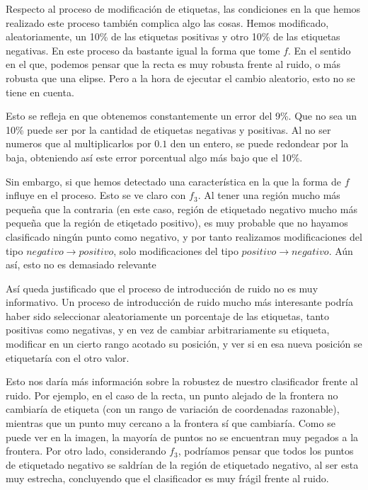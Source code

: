 \documentclass[11pt]{article}
\begin{document}
Respecto al proceso de modificación de etiquetas, las condiciones en la que hemos realizado este proceso también complica algo las cosas. Hemos modificado, aleatoriamente, un 10\% de las etiquetas positivas y otro 10\% de las etiquetas negativas. En este proceso da bastante igual la forma que tome $f$. En el sentido en el que, podemos pensar que la recta es muy robusta frente al ruido, o más robusta que una elipse. Pero a la hora de ejecutar el cambio aleatorio, esto no se tiene en cuenta.

Esto se refleja en que obtenemos constantemente un error del 9\%. Que no sea un 10\% puede ser por la cantidad de etiquetas negativas y positivas. Al no ser numeros que al multiplicarlos por $0.1$ den un entero, se puede redondear por la baja, obteniendo así este error porcentual algo más bajo que el 10\%.

Sin embargo, si que hemos detectado una característica en la que la forma de $f$ influye en el proceso. Esto se ve claro con $f_3$. Al tener una región mucho más pequeña que la contraria (en este caso, región de etiquetado negativo mucho más pequeña que la región de etiqetado positivo), es muy probable que no hayamos clasificado ningún punto como negativo, y por tanto realizamos modificaciones del tipo $negativo \rightarrow positivo$, solo modificaciones del tipo $positivo \rightarrow negativo$. Aún así, esto no es demasiado relevante

Así queda justificado que el proceso de introducción de ruido no es muy informativo. Un proceso de introducción de ruido mucho más interesante podría haber sido seleccionar aleatoriamente un porcentaje de las etiquetas, tanto positivas como negativas, y en vez de cambiar arbitrariamente su etiqueta, modificar en un cierto rango acotado su posición, y ver si en esa nueva posición se etiquetaría con el otro valor.

Esto nos daría más información sobre la robustez de nuestro clasificador frente al ruido. Por ejemplo, en el caso de la recta, un punto alejado de la frontera no cambiaría de etiqueta (con un rango de variación de coordenadas razonable), mientras que un punto muy cercano a la frontera sí que cambiaría. Como se puede ver en la imagen, la mayoría de puntos no se encuentran muy pegados a la frontera. Por otro lado, considerando $f_3$, podríamos pensar que todos los puntos de etiquetado negativo se saldrían de la región de etiquetado negativo, al ser esta muy estrecha, concluyendo que el clasificador es muy frágil frente al ruido.
\end{document}
